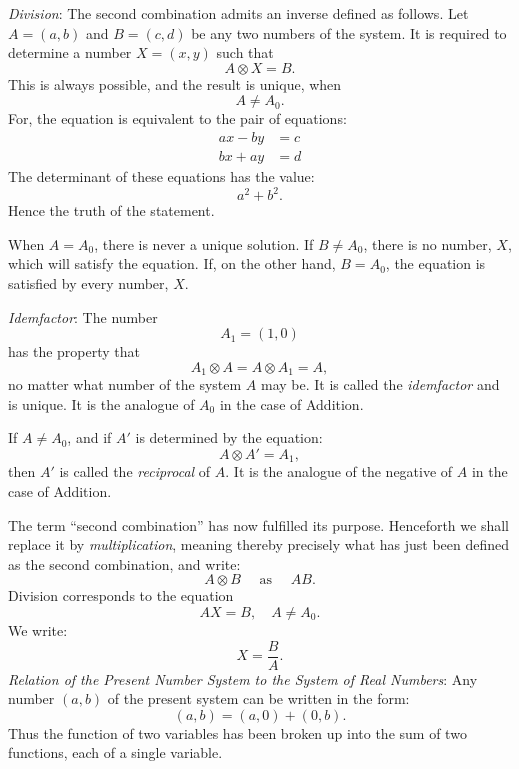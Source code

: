 \documentclass[letter,oneside]{memoir}
\begin{document}
\emph{Division}: The second combination admits an inverse defined as follows. Let $A=(a,b)$ and $B=(c,d)$ be any two numbers of the system. It is required to determine a number $X=(x,y)$ such that
\[
A\otimes X=B
.\] This is always possible, and the result is unique, when
\[
A\neq A_0
.\] For, the equation is equivalent to the pair of equations:
\begin{align*}
	ax-by&=c\\
	bx+ay&=d
\end{align*} The determinant of these equations has the value:
\[
a^2+b^2
.\] Hence the truth of the statement.

When $A=A_0$, there is never a unique solution. If $B\neq A_0$, there is no number, $X$, which will satisfy the equation. If, on the other hand, $B=A_0$, the equation is satisfied by every number, $X$. 

\emph{Idemfactor}: The number
\[
	A_1=(1,0)
\] has the property that
\[
A_1\otimes A=A\otimes A_1=A
,\] no matter what number of the system $A$ may be. It is called the \emph{idemfactor} and is unique. It is the analogue of $A_0$ in the case of Addition. 

If $A\neq A_0$, and if $A'$ is determined by the equation:
\[
A\otimes A'=A_1
,\] then $A'$ is called the \emph{reciprocal} of $A$. It is the analogue of the negative of $A$ in the case of Addition.

The term ``second combination'' has now fulfilled its purpose. Henceforth we shall replace it by \emph{multiplication}, meaning thereby precisely what has just been defined as the second combination, and write:
\[
A\otimes B \quad \text{ as } \quad AB
.\] Division corresponds to the equation 
\[
AX=B, \quad A\neq A_0
.\] We write:
\[
X=\frac{B}{A}
.\] \emph{Relation of the Present Number System to the System of Real Numbers}: Any number $(a,b)$ of the present system can be written in the form:
\[
	(a,b)=(a,0)+(0,b)
.\] Thus the function of two variables has been broken up into the sum of two functions, each of a single variable. 
\end{document}
